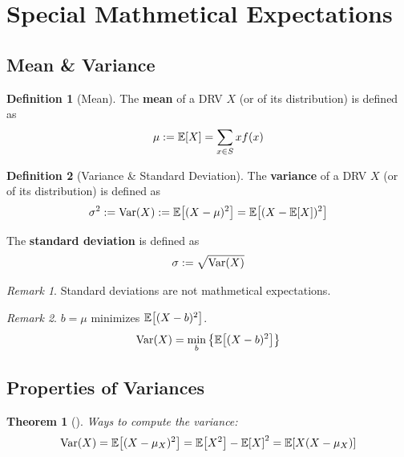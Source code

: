 \documentclass[10pt,UTF8]{article}
\newenvironment{definition box}
{\begin{tcolorbox}[colback=blue!5!white,colframe=blue!75!black,parbox=false,before upper=\par,before lower=\par]}
{\end{tcolorbox}}
\newenvironment{theorem box}
{\begin{tcolorbox}[colback=yellow!5!white,colframe=yellow!75!black,parbox=false,before upper=\par,before lower=\par]}
{\end{tcolorbox}}
\theoremstyle{definition}
\newtheorem{definition inner}{Definition}[section]
\newenvironment{definition}[1][]
{\begin{definition box}\begin{definition inner}[#1]\hfill\par}
{\end{definition inner}\end{definition box}}
\theoremstyle{plain}
\newtheorem{theorem inner}{Theorem}[section]
\newenvironment{theorem}[1][]
{\begin{theorem box}\begin{theorem inner}[#1]\hfill\par}
{\end{theorem inner}\end{theorem box}}
\theoremstyle{definition}
\newtheorem*{proof inner}{\textit{Proof}}
\theoremstyle{remark}
\newtheorem*{remark}{\textit{Remark}}
\newcommand{\E}[1]{\mathbb{E}\qty[#1]}  %
\newcommand{\Var}[1]{\mathrm{Var}\qty(#1)}  %
\begin{document}
\section{Special Mathmetical Expectations}

\subsection{Mean \& Variance}

\begin{definition}[Mean]
    The \textbf{mean} of a DRV $X$ (or of its distribution) is defined as
    \begin{equation*}
        \mu := \E{X} = \sum_{x\in S}x f(x)
    \end{equation*}
\end{definition}

\begin{definition}[Variance \& Standard Deviation]
    The \textbf{variance} of a DRV $X$ (or of its distribution) is defined as
    \begin{equation*}
        \sigma^2 := \Var{X} := \E{(X-\mu)^2} = \E{(X-\E{X})^2}
    \end{equation*}

    The \textbf{standard deviation} is defined as
    \begin{equation*}
        \sigma := \sqrt{\Var{X}}
    \end{equation*}
\end{definition}

\begin{remark}
    {Standard deviations} are not {mathmetical expectations}.
\end{remark}

\begin{remark}
    $b=\mu$ minimizes $\E{(X-b)^2}$.
    \begin{equation*}
        \Var{X} = \min_{b}\qty{ \E{(X-b)^2} }
    \end{equation*}
\end{remark}

\subsection{Properties of Variances}

\begin{theorem}
    Ways to compute the variance:
    \begin{equation*}
        \Var{X} = \E{(X-\mu_X)^2} = \E{X^2} - \E{X}^2 = \E{X(X-\mu_X)}
    \end{equation*}
\end{theorem}
\end{document}
